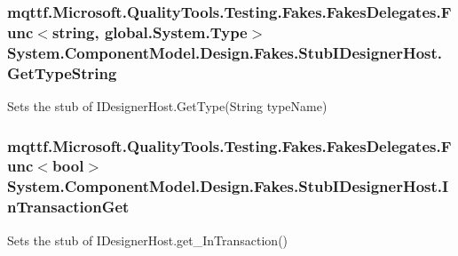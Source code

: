 \hypertarget{class_system_1_1_component_model_1_1_design_1_1_fakes_1_1_stub_i_designer_host_a40e758ff918a0cc7e83fc6cd2b2d335a}{
\subsubsection[{Get\-Type\-String}]{\setlength{\rightskip}{0pt plus 5cm}mqttf.\-Microsoft.\-Quality\-Tools.\-Testing.\-Fakes.\-Fakes\-Delegates.\-Func$<$string, global.\-System.\-Type$>$ System.\-Component\-Model.\-Design.\-Fakes.\-Stub\-I\-Designer\-Host.\-Get\-Type\-String}}\label{class_system_1_1_component_model_1_1_design_1_1_fakes_1_1_stub_i_designer_host_a40e758ff918a0cc7e83fc6cd2b2d335a}


Sets the stub of I\-Designer\-Host.\-Get\-Type(\-String type\-Name)

\hypertarget{class_system_1_1_component_model_1_1_design_1_1_fakes_1_1_stub_i_designer_host_a900e7faac6c188dc65a0e912b66afd12}{
\subsubsection[{In\-Transaction\-Get}]{\setlength{\rightskip}{0pt plus 5cm}mqttf.\-Microsoft.\-Quality\-Tools.\-Testing.\-Fakes.\-Fakes\-Delegates.\-Func$<$bool$>$ System.\-Component\-Model.\-Design.\-Fakes.\-Stub\-I\-Designer\-Host.\-In\-Transaction\-Get}}\label{class_system_1_1_component_model_1_1_design_1_1_fakes_1_1_stub_i_designer_host_a900e7faac6c188dc65a0e912b66afd12}


Sets the stub of I\-Designer\-Host.\-get\-\_\-\-In\-Transaction()

